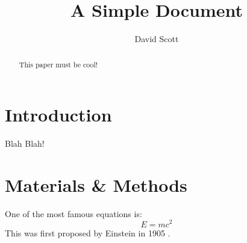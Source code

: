 \documentclass[12pt]{article}
\title{A Simple Document}
\author{David Scott}
\date{}
\begin{document}
  \maketitle

  \begin{abstract}
    This paper must be cool!
  \end{abstract}

  \section{Introduction}
    Blah Blah!

  \section{Materials \& Methods}
  One of the most famous equations is:
  \begin{equation}
    E = mc^2
  \end{equation}
  This was first proposed by Einstein in 1905
  \cite{einstein1905does}.

  
  
\end{document}
